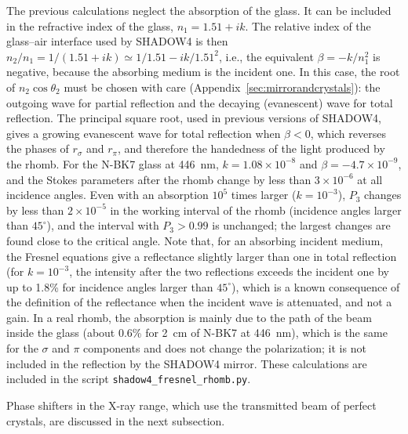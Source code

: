 \documentclass{iucr}
\begin{document}
The previous calculations neglect the absorption of the glass. It can be included in the refractive index of the glass, $n_1=1.51+ik$. The relative index of the glass--air interface used by SHADOW4 is then $n_2/n_1=1/(1.51+ik)\simeq1/1.51-ik/1.51^2$, i.e., the equivalent $\beta=-k/n_1^2$ is negative, because the absorbing medium is the incident one. In this case, the root of $n_2\cos\theta_2$ must be chosen with care (Appendix~\ref{sec:mirrorandcrystals}): the outgoing wave for partial reflection and the decaying (evanescent) wave for total reflection. The principal square root, used in previous versions of SHADOW4, gives a growing evanescent wave for total reflection when $\beta<0$, which reverses the phases of $r_\sigma$ and $r_\pi$, and therefore the handedness of the light produced by the rhomb. For the N-BK7 glass at 446~nm, $k=1.08\times10^{-8}$ \cite{RefractiveIndexDatabase2024} and $\beta=-4.7\times10^{-9}$, and the Stokes parameters after the rhomb change by less than $3\times10^{-6}$ at all incidence angles. Even with an absorption $10^5$ times larger ($k=10^{-3}$), $P_3$ changes by less than $2\times10^{-5}$ in the working interval of the rhomb (incidence angles larger than $45^\circ$), and the interval with $P_3>0.99$ is unchanged; the largest changes are found close to the critical angle. Note that, for an absorbing incident medium, the Fresnel equations give a reflectance slightly larger than one in total reflection (for $k=10^{-3}$, the intensity after the two reflections exceeds the incident one by up to 1.8\% for incidence angles larger than $45^\circ$), which is a known consequence of the definition of the reflectance when the incident wave is attenuated, and not a gain. In a real rhomb, the absorption is mainly due to the path of the beam inside the glass (about 0.6\% for 2~cm of N-BK7 at 446~nm), which is the same for the $\sigma$ and $\pi$ components and does not change the polarization; it is not included in the reflection by the SHADOW4 mirror. These calculations are included in the script {\tt shadow4\_fresnel\_rhomb.py}.

Phase shifters in the X-ray range, which use the transmitted beam of perfect crystals, are discussed in the next subsection.
\end{document}

